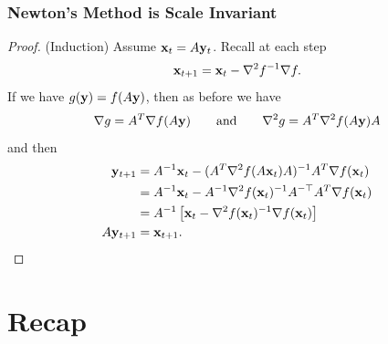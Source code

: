 \documentclass{beamer}
\begin{document}
\begin{frame}
    \frametitle{Newton's Method is Scale Invariant}
    \begin{proof}
        (Induction) Assume ${\bf x}_t = A{\bf y}_t$.
        Recall at each step
        \[
            {\bf x}_{t+1} = {\bf x}_t - \nabla^2 f^{-1} \nabla f.
        \]
        If we have $g({\bf y}) = f(A{\bf y})$, then as before we have
        \[
            \nabla g = A^T\nabla f(A{\bf y}) \qquad\text{and}\qquad \nabla^2 g = A^T \nabla^2 f(A{\bf y}) A
        \]
        and then
        \begin{align*}
            {\bf y}_{t+1} &= A^{-1}{\bf x}_t - (A^T \nabla^2 f(A{\bf x}_t) A)^{-1} A^T\nabla f({\bf x}_t)\\
            &= A^{-1}{\bf x}_t - A^{-1} \nabla^2 f({\bf x}_t)^{-1} A^{-\top} A^T\nabla f({\bf x}_t)\\
            &= A^{-1}\left[{\bf x}_t - \nabla^2 f({\bf x}_t)^{-1}\nabla f({\bf x}_t)\right]\\
            A{\bf y}_{t+1} &= {\bf x}_{t+1}.
        \end{align*}
    \end{proof}
\end{frame}

\section{Recap}
\end{document}
